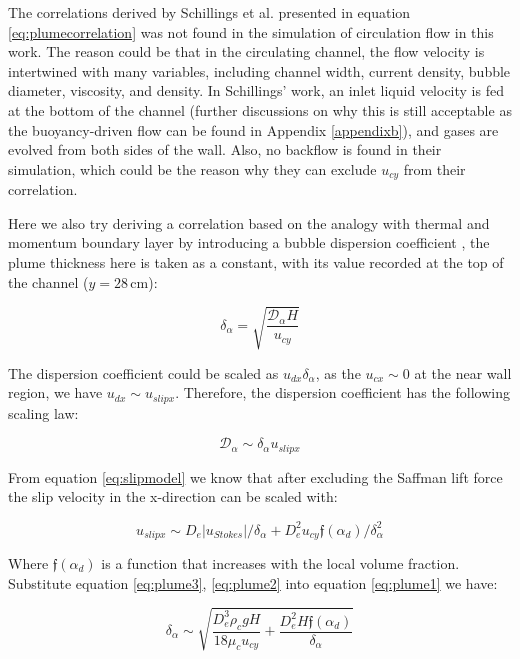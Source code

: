 The correlations derived by Schillings et al. \cite{Schillings2015} presented in equation \ref{eq:plumecorrelation} was not found in the simulation of circulation flow in this work. The reason could be that in the circulating channel, the flow velocity is intertwined with many variables, including channel width, current density, bubble diameter, viscosity, and density. In Schillings' work, an inlet liquid velocity is fed at the bottom of the channel (further discussions on why this is still acceptable as the buoyancy-driven flow can be found in Appendix \ref{appendixb}), and gases are evolved from both sides of the wall.  Also, no backflow is found in their simulation, which could be the reason why they can exclude $u_{cy}$ from their correlation.

Here we also try deriving a correlation based on the analogy with thermal and momentum boundary layer by introducing a bubble dispersion coefficient \cite{Schillings2015}, the plume thickness here is taken as a constant, with its value recorded at the top of the channel ($y = 28  \, \mathrm{cm}$):

\begin{equation}\label{eq:plume1}
    \delta_{\alpha} = \sqrt{\frac{\mathcal{D_{\alpha}}H}{u_{cy}}}
\end{equation}

The dispersion coefficient could be scaled as $u_{dx}\delta_{\alpha}$, as the $u_{cx} \sim 0$ at the near wall region, we have $u_{dx} \sim u_{slipx}$. Therefore, the dispersion coefficient has the following scaling law:

\begin{equation}\label{eq:plume2}
    \mathcal{D_{\alpha}} \sim  \delta_{\alpha} u_{slipx}
\end{equation}

From equation \ref{eq:slipmodel} we know that after excluding the Saffman lift force the slip velocity in the x-direction can be scaled with:

\begin{equation}\label{eq:plume3}
    u_{slipx} \sim D_e |u_{Stokes}| /\delta_{\alpha} + D_e^2 u_{cy} \mathfrak{f}(\alpha_d) /\delta_{\alpha}^2 
\end{equation}

Where $\mathfrak{f}(\alpha_d)$ is a function that increases with the local volume fraction. Substitute equation \ref{eq:plume3}, \ref{eq:plume2} into equation \ref{eq:plume1} we have:

\begin{equation}\label{eq:plume4}
    \delta_{\alpha} \sim \sqrt{\frac{D_e^3 \rho_c g H}{18\mu_c u_{cy}}+\frac{D_e^2 H \mathfrak{f}(\alpha_d)}{\delta_{\alpha}}}
\end{equation}

